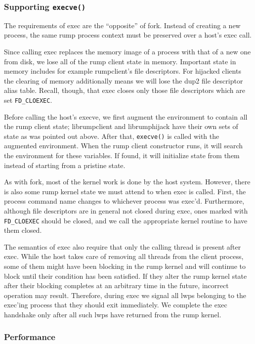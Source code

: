 \subsubsection*{Supporting \texttt{execve()}}

The requirements of exec are the ``opposite'' of fork.  Instead of
creating a new process, the same rump process context must be
preserved over a host's exec call.

Since calling exec replaces the memory image of a process with that
of a new one from disk, we lose all of the rump client state in
memory.  Important state in memory includes for example rumpclient's
file descriptors.  For hijacked clients the clearing of memory
additionally means we will lose \eg the dup2 file descriptor alias table.
Recall, though, that exec closes only those file descriptors which are
set \verb+FD_CLOEXEC+.

Before calling the host's execve, we first augment the environment
to contain all the rump client state; librumpclient and librumphijack
have their own sets of state as was pointed out above.  After that,
\verb+execve()+ is called with the augmented environment.  When
the rump client constructor runs, it will search the environment
for these variables.  If found, it will initialize state from them
instead of starting from a pristine state.

As with fork, most of the kernel work is done by the host system.
However, there is also some rump kernel state we must attend to
when exec is called.  First, the process command name changes to
whichever process was exec'd.  Furthermore, although file descriptors
are in general not closed during exec, ones marked with \verb+FD_CLOEXEC+
should be closed, and we call the appropriate kernel routine to
have them closed.

The semantics of exec also require that only the calling thread is
present after exec.  While the host takes care of removing all
threads from the client process, some of them might have been
blocking in the rump kernel and will continue to block until their
condition has been satisfied.  If they alter the rump kernel state
after their blocking completes at an arbitrary time in the future,
incorrect operation may result.  Therefore, during exec we signal
all lwps belonging to the exec'ing process that they should exit
immediately.  We complete the exec handshake only after all
such lwps have returned from the rump kernel.


\subsubsection{Performance}

